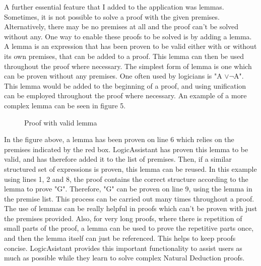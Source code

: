 A further essential feature that I added to the application was lemmas. Sometimes, it is not possible to solve a proof with the given premises. Alternatively, there may be no premises at all and the proof can't be solved without any. One way to enable these proofs to be solved is by adding a lemma. A lemma is an expression that has been proven to be valid either with or without its own premises, that can be added to a proof. This lemma can then be used throughout the proof where necessary. The simplest form of lemma is one which can be proven without any premises. One often used by logicians is "A $\vee \neg$A". This lemma would be added to the beginning of a proof, and using unification can be employed throughout the proof where necessary. An example of a more complex lemma can be seen in figure 5.

\begin{figure}[!ht]
	\centering
	\caption{Proof with valid lemma}
\end{figure}

In the figure above, a lemma has been proven on line 6 which relies on the premises indicated by the red box. LogicAssistant has proven this lemma to be valid, and has therefore added it to the list of premises. Then, if a similar structured set of expressions is proven, this lemma can be reused. In this example using lines 1, 2 and 8, the proof contains the correct structure according to the lemma to prove "G". Therefore, "G" can be proven on line 9, using the lemma in the premise list. This process can be carried out many times throughout a proof. The use of lemmas can be really helpful in proofs which can't be proven with just the premises provided. Also, for very long proofs, where there is repetition of small parts of the proof, a lemma can be used to prove the repetitive parts once, and then the lemma itself can just be referenced. This helps to keep proofs concise. LogicAsistant provides this important functionality to assist users as much as possible while they learn to solve complex Natural Deduction proofs. 


